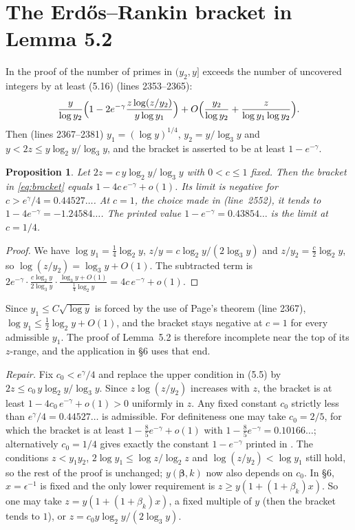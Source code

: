 \documentclass[11pt,a4paper]{amsart}
\newtheorem{proposition}[theorem]{Proposition}
\theoremstyle{remark}
\newcommand{\eg}{e^{-\gamma}}
\begin{document}
\section{The Erd\H{o}s--Rankin bracket in Lemma 5.2}\label{sec:ER}

In the proof of \cite[Lemma~5.2]{BFM} the number of primes in $(y_2,y]$ exceeds the number of uncovered integers by
at least (5.16) (lines 2353--2365):
\begin{equation}\label{eq:bracket}
\frac y{\log y_2}\Bigl(1-2\eg\frac{z\log(z/y_2)}{y\log y_1}\Bigr)+O\Bigl(\frac{y_2}{\log y_2}+\frac z{\log y_1\log y_2}\Bigr).
\end{equation}
Then (lines 2367--2381) $y_1=(\log y)^{1/4}$, $y_2=y/\log_3y$ and $y<2z\le y\log_2y/\log_3y$, and the bracket is
asserted to be at least $1-\eg$.

\begin{proposition}\label{prop:ER}
Let $2z=c\,y\log_2y/\log_3y$ with $0<c\le1$ fixed. Then the bracket in \eqref{eq:bracket} equals
$1-4c\,\eg+o(1)$. Its limit is negative for $c>e^\gamma/4=0.44527\ldots$. At $c=1$, the choice made in
\cite[\S6]{BFM} (line~2552), it tends to $1-4\eg=-1.24584\ldots$. The printed value $1-\eg=0.43854\ldots$ is the
limit at $c=1/4$.
\end{proposition}

\begin{proof}
We have $\log y_1=\frac14\log_2y$, $z/y=c\log_2y/(2\log_3y)$ and $z/y_2=\frac c2\log_2y$, so
$\log(z/y_2)=\log_3y+O(1)$. The subtracted term is
$2\eg\cdot\frac{c\log_2y}{2\log_3y}\cdot\frac{\log_3y+O(1)}{\frac14\log_2y}=4c\,\eg+o(1)$.
\end{proof}

Since $y_1\le C\sqrt{\log y}$ is forced by the use of Page's theorem (line 2367), $\log y_1\le\frac12\log_2y+O(1)$,
and the bracket stays negative at $c=1$ for every admissible $y_1$. The proof of Lemma~5.2 is therefore incomplete
near the top of its $z$-range, and the application in \S6 uses that end.

\emph{Repair.} Fix $c_0<e^\gamma/4$ and replace the upper condition in (5.5) by $2z\le c_0\,y\log_2y/\log_3y$.
Since $z\log(z/y_2)$ increases with $z$, the bracket is at least $1-4c_0\,\eg+o(1)>0$ uniformly in $z$. Any fixed
constant $c_0$ strictly less than $e^\gamma/4=0.44527\ldots$ is admissible. For definiteness one may take $c_0=2/5$,
for which the bracket is at least $1-\frac85\eg+o(1)$ with $1-\frac85\eg=0.10166\ldots$; alternatively $c_0=1/4$
gives exactly the constant $1-\eg$ printed in \cite{BFM}. The
conditions $z<y_1y_2$, $2\log y_1\le\log z/\log_2z$ and $\log(z/y_2)<\log y_1$ still hold, so the rest of the proof is
unchanged; $y(\boldsymbol\beta,k)$ now also depends on $c_0$. In \S6, $x=\epsilon^{-1}$ is fixed and the only lower
requirement is $z\ge y(1+(1+\beta_k)x)$. So one may take $z=y(1+(1+\beta_k)x)$, a fixed multiple of $y$ (then
the bracket tends to $1$), or $z=c_0y\log_2y/(2\log_3y)$.
\end{document}
